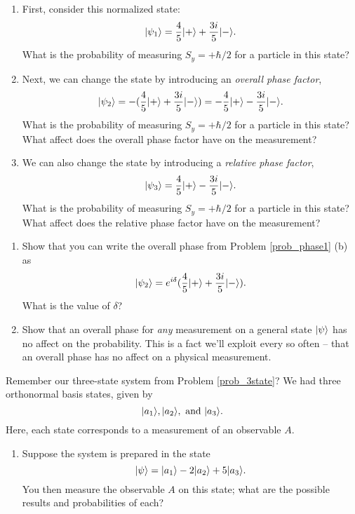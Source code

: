 \begin{problem}
\label{prob_phase1}
\begin{enumerate}[label=(\alph*)] 
\item First, consider this normalized state:
\[
| \psi_1 \rangle = \frac{4}{5} | + \rangle + \frac{3i}{5} | - \rangle.
\]
What is the probability of measuring $S_y = +\hbar/2$ for a particle in this state?
\item Next, we can change the state by introducing an \emph{overall phase factor},
\[
| \psi_2 \rangle = -(\frac{4}{5} | + \rangle + \frac{3i}{5} | - \rangle) = -\frac{4}{5} | + \rangle - \frac{3i}{5} | - \rangle.
\]
What is the probability of measuring $S_y = +\hbar/2$ for a particle in this state?  What affect does the overall phase factor have on the measurement?
\item We can also change the state by introducing a \emph{relative phase factor},
\[
| \psi_3 \rangle = \frac{4}{5} | + \rangle - \frac{3i}{5} | - \rangle.
\]
What is the probability of measuring $S_y = +\hbar/2$ for a particle in this state?  What affect does the relative phase factor have on the measurement?
\end{enumerate}
\end{problem}

\begin{problem}
\begin{enumerate}[label=(\alph*)] 
\item Show that you can write the overall phase from Problem \ref{prob_phase1} (b) as
\[
| \psi_2 \rangle = e^{i\delta} (\frac{4}{5} | + \rangle + \frac{3i}{5} | - \rangle).
\]
What is the value of $\delta$?
\item Show that an overall phase for \emph{any} measurement on a general state $| \psi \rangle$ has no affect on the probability.  This is a fact we'll exploit every so often -- that an overall phase has no affect on a physical measurement. 
\end{enumerate}
\end{problem}

\begin{problem}
Remember our three-state system from Problem \ref{prob_3state}? We had three orthonormal basis states, given by
\[
| a_1 \rangle, | a_2 \rangle, \text{ and }  | a_3 \rangle.
\]
Here, each state corresponds to a measurement of an observable $A$.
\begin{enumerate}[label=(\alph*)]
\item Suppose the system is prepared in the state
\[
| \psi \rangle =  | a_1 \rangle - 2 | a_2 \rangle + 5 | a_3 \rangle.
\]
You then measure the observable $A$  on this state; what are the possible results and probabilities of each?
\end{enumerate}
\end{problem}

